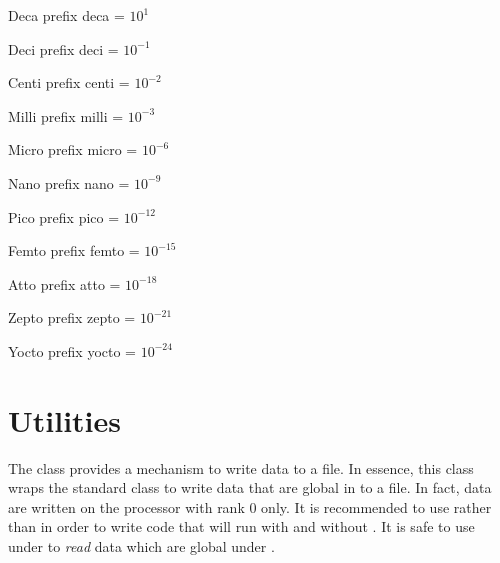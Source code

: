 \begin{datadesc}{Deca}
prefix deca = $10^1$
\end{datadesc}

\begin{datadesc}{Deci}
prefix deci = $10^{-1}$
\end{datadesc}

\begin{datadesc}{Centi}
prefix centi = $10^{-2}$
\end{datadesc}

\begin{datadesc}{Milli}
prefix milli = $10^{-3}$
\end{datadesc}

\begin{datadesc}{Micro}
prefix micro = $10^{-6}$
\end{datadesc}

\begin{datadesc}{Nano}
prefix nano = $10^{-9}$
\end{datadesc}

\begin{datadesc}{Pico}
prefix pico = $10^{-12}$
\end{datadesc}

\begin{datadesc}{Femto}
prefix femto = $10^{-15}$
\end{datadesc}

\begin{datadesc}{Atto}
prefix atto = $10^{-18}$
\end{datadesc}

\begin{datadesc}{Zepto}
prefix zepto = $10^{-21}$
\end{datadesc}

\begin{datadesc}{Yocto}
prefix yocto = $10^{-24}$
\end{datadesc}

\section{Utilities}
The  class provides a mechanism to write data to a file.
In essence, this class wraps the standard \PYTHON {} class to write
data that are global in \MPI to a file. In fact, data are written on the
processor with \MPI rank 0 only. It is recommended to use 
rather than  in order to write code that will run with and without
\MPI. It is safe to use  under \MPI to \emph{read} data which are
global under \MPI.

